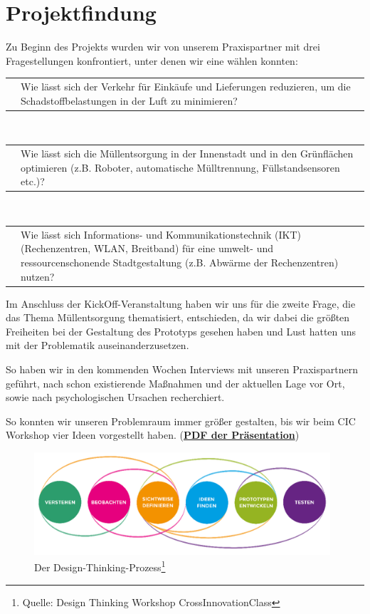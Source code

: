 \chapter{Projektfindung}\label{chp:projektfindung}

    Zu Beginn des Projekts wurden wir von unserem Praxispartner mit drei Fragestellungen konfrontiert, unter denen wir eine wählen konnten:

    \vspace{1em}
    \begin{tabular}{ l|p{13.5cm} }
        \quad & Wie lässt sich der Verkehr für Einkäufe und Lieferungen reduzieren, um die Schadstoffbelastungen in der Luft zu minimieren?
    \end{tabular}
    \\[1em]
    \begin{tabular}{ l|p{13.5cm} }
        \quad & Wie lässt sich die Müllentsorgung in der Innenstadt und in den Grünflächen optimieren (z.B. Roboter, automatische Mülltrennung, Füllstandsensoren etc.)?
    \end{tabular}
    \\[1em]
    \begin{tabular}{ l|p{13.5cm} }
        \quad & Wie lässt sich Informations- und Kommunikationstechnik (IKT) (Rechenzentren, WLAN, Breitband) für eine umwelt- und ressourcenschonende Stadtgestaltung (z.B. Abwärme der Rechenzentren) nutzen? 
    \end{tabular}
    \vspace{1em}

    Im Anschluss der KickOff-Veranstaltung haben wir uns für die zweite Frage, die das Thema Müllentsorgung thematisiert, entschieden, da wir dabei die größten Freiheiten bei der Gestaltung des Prototyps gesehen haben und Lust hatten uns mit der Problematik auseinanderzusetzen.

    So haben wir in den kommenden Wochen Interviews mit unseren Praxispartnern geführt, nach schon existierende Maßnahmen und der aktuellen Lage vor Ort, sowie nach psychologischen Ursachen recherchiert.
    
    So konnten wir unseren Problemraum immer größer gestalten, bis wir beim CIC Workshop vier Ideen vorgestellt haben. (\href{run:attachments/Frankfurt_Ideen_CIC.pdf}{\textbf{PDF der Präsentation}})

    \begin{figure}[h]
        \begin{center}
            \includegraphics[width=11cm]{media/00_introduction/design_thinking_2.png}
        \end{center}
        \caption{Der Design-Thinking-Prozess\protect\footnote{Quelle: Design Thinking Workshop CrossInnovationClass}}
        \label{fig:dt_2}
    \end{figure}

